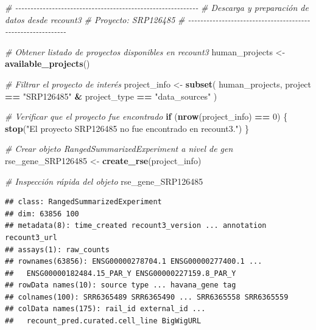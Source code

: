 \documentclass[
  spanish,
  11pt,
]{article}
\newenvironment{Shaded}{\begin{snugshade}}{\end{snugshade}}
\newcommand{\CommentTok}[1]{\textcolor[rgb]{0.56,0.35,0.01}{\textit{#1}}}
\newcommand{\ControlFlowTok}[1]{\textcolor[rgb]{0.13,0.29,0.53}{\textbf{#1}}}
\newcommand{\DecValTok}[1]{\textcolor[rgb]{0.00,0.00,0.81}{#1}}
\newcommand{\FunctionTok}[1]{\textcolor[rgb]{0.13,0.29,0.53}{\textbf{#1}}}
\newcommand{\NormalTok}[1]{#1}
\newcommand{\OtherTok}[1]{\textcolor[rgb]{0.56,0.35,0.01}{#1}}
\newcommand{\SpecialCharTok}[1]{\textcolor[rgb]{0.81,0.36,0.00}{\textbf{#1}}}
\newcommand{\StringTok}[1]{\textcolor[rgb]{0.31,0.60,0.02}{#1}}
\begin{document}
\begin{Shaded}
\begin{Highlighting}[]
\CommentTok{\# {-}{-}{-}{-}{-}{-}{-}{-}{-}{-}{-}{-}{-}{-}{-}{-}{-}{-}{-}{-}{-}{-}{-}{-}{-}{-}{-}{-}{-}{-}{-}{-}{-}{-}{-}{-}{-}{-}{-}{-}{-}{-}{-}{-}{-}{-}{-}{-}{-}{-}{-}{-}{-}{-}{-}{-}{-}{-}{-}{-}}
\CommentTok{\# Descarga y preparación de datos desde recount3}
\CommentTok{\# Proyecto: SRP126485}
\CommentTok{\# {-}{-}{-}{-}{-}{-}{-}{-}{-}{-}{-}{-}{-}{-}{-}{-}{-}{-}{-}{-}{-}{-}{-}{-}{-}{-}{-}{-}{-}{-}{-}{-}{-}{-}{-}{-}{-}{-}{-}{-}{-}{-}{-}{-}{-}{-}{-}{-}{-}{-}{-}{-}{-}{-}{-}{-}{-}{-}{-}{-}}

\CommentTok{\# Obtener listado de proyectos disponibles en recount3}
\NormalTok{human\_projects }\OtherTok{\textless{}{-}} \FunctionTok{available\_projects}\NormalTok{()}

\CommentTok{\# Filtrar el proyecto de interés}
\NormalTok{project\_info }\OtherTok{\textless{}{-}} \FunctionTok{subset}\NormalTok{(}
\NormalTok{  human\_projects,}
\NormalTok{  project }\SpecialCharTok{==} \StringTok{"SRP126485"} \SpecialCharTok{\&} 
\NormalTok{  project\_type }\SpecialCharTok{==} \StringTok{"data\_sources"}
\NormalTok{)}

\CommentTok{\# Verificar que el proyecto fue encontrado}
\ControlFlowTok{if}\NormalTok{ (}\FunctionTok{nrow}\NormalTok{(project\_info) }\SpecialCharTok{==} \DecValTok{0}\NormalTok{) \{}
  \FunctionTok{stop}\NormalTok{(}\StringTok{"El proyecto SRP126485 no fue encontrado en recount3."}\NormalTok{)}
\NormalTok{\}}

\CommentTok{\# Crear objeto RangedSummarizedExperiment a nivel de gen}
\NormalTok{rse\_gene\_SRP126485 }\OtherTok{\textless{}{-}} \FunctionTok{create\_rse}\NormalTok{(project\_info)}

\CommentTok{\# Inspección rápida del objeto}
\NormalTok{rse\_gene\_SRP126485}
\end{Highlighting}
\end{Shaded}

\begin{verbatim}
## class: RangedSummarizedExperiment 
## dim: 63856 100 
## metadata(8): time_created recount3_version ... annotation recount3_url
## assays(1): raw_counts
## rownames(63856): ENSG00000278704.1 ENSG00000277400.1 ...
##   ENSG00000182484.15_PAR_Y ENSG00000227159.8_PAR_Y
## rowData names(10): source type ... havana_gene tag
## colnames(100): SRR6365489 SRR6365490 ... SRR6365558 SRR6365559
## colData names(175): rail_id external_id ...
##   recount_pred.curated.cell_line BigWigURL
\end{verbatim}
\end{document}
